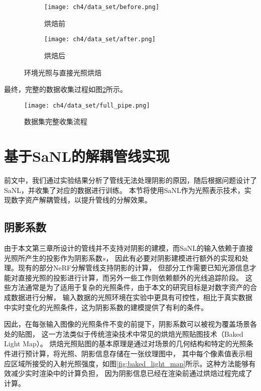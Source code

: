 \begin{figure}[H]
  \centering
  \begin{subfigure}[t]{0.45\textwidth}
    \centering
    \texttt{[image: ch4/data\_set/before.png]}
    \caption{烘焙前}
  \end{subfigure}
  \begin{subfigure}[t]{0.45\textwidth}
    \centering
    \texttt{[image: ch4/data\_set/after.png]}
    \caption{烘焙后}
  \end{subfigure}
  \caption{环境光照与直接光照烘焙}
  \label{fig:light_baking}
\end{figure}

最终，完整的数据收集过程如图\ref{fig:full_pipe}所示。

\begin{figure}[htb]
  \centering
  \texttt{[image: ch4/data\_set/full\_pipe.png]}
  \caption{数据集完整收集流程}
  \label{fig:full_pipe}
\end{figure}

\section{基于SaNL的解耦管线实现}

前文中，我们通过实验结果分析了管线无法处理阴影的原因，随后根据问题设计了SaNL，并收集了对应的数据进行训练。
本节将使用SaNL作为光照表示技术，实现数字资产解耦管线，以提升管线的分解效果。

\subsection{阴影系数}

由于本文第三章所设计的管线并不支持对阴影的建模，而SaNL的输入依赖于直接光照所产生的投影作为阴影系数$s$，
因此有必要对阴影建模进行额外的实现和处理。现有的部分NeRF分解管线支持阴影的计算，
但部分工作需要已知光源信息才能对直接光照的投影进行计算，而另外一些工作则依赖额外的光线追踪阶段。
这些方法通常是为了适用于复杂的光照条件，由于本文的研究目标是对数字资产的合成数据进行分解，
输入数据的光照环境在实验中更具有可控性，相比于真实数据中实时变化的光照条件，这为阴影系数的建模提供了有利的条件。

因此，在每张输入图像的光照条件不变的前提下，阴影系数可以被视为覆盖场景各处的贴图，
这一方法类似于传统渲染技术中常见的烘焙光照贴图技术（Baked Light Map）。
烘焙光照贴图的基本原理是通过对场景的几何结构和特定的光照条件进行预计算，将光照、阴影信息存储在一张纹理图中，
其中每个像素值表示相应区域所接受的入射光照强度，如图\ref{fig:baked_light_map}所示。这种方法能够有效减少实时渲染中的计算负担，
因为阴影信息已经在渲染前通过烘焙过程完成了计算。

